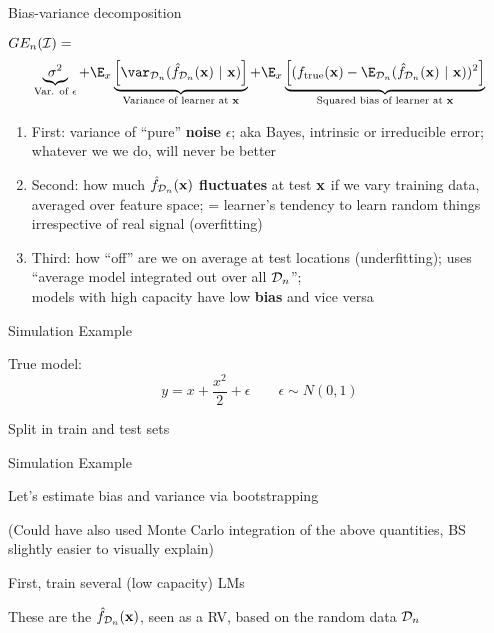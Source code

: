 \documentclass[11pt,compress,t,notes=noshow, xcolor=table]{beamer}
\begin{document}
\begin{frame}{Bias-variance decomposition}


$GE_n(\mathcal{I}) =$  
$$
 \underbrace{\sigma^2}_{\text{Var. of $\epsilon$}} + \E_{x}\underbrace{\left[\var_{\D_n}(\fh_{\D_n}(\xv) ~|~\xv)\right]}_{\text{Variance of learner at } \xv} + \E_{x}\underbrace{\left[(\ftrue(\xv)-\E_{\D_n}(\fh_{\D_n}(\xv)~|~\xv))^2\right]}_{\text{Squared bias of learner at } \xv}  
$$

\begin{enumerate}
  \item First: variance of ``pure''
     \textbf{noise} $\epsilon$; aka Bayes, intrinsic or irreducible error; 
    whatever we we do, will never be better
  \item Second: how much \textbf{$\hat{f}_{\mathcal{D}_n}(\mathbf{x})$ fluctuates} at test $\mathbf{x}$ if we vary training data, averaged over feature space; = learner's tendency to learn random things irrespective of real signal (overfitting)
  
  \item Third: how ``off'' are we on average at test locations (underfitting); uses ``average model integrated out over all $\mathcal{D}_n$''; \\
  models with high capacity have low \textbf{bias} and vice versa
\end{enumerate}


\end{frame} 

\begin{framei}[sep=L]{Simulation Example}

\item True model:
$$y = x + \frac{x^2}{2} + \epsilon  \qquad \epsilon \sim 
N (0, 1)$$
\item Split in train and test sets 


\end{framei} 


\begin{framei}[sep=M]{Simulation Example}

\item Let's estimate bias and variance via bootstrapping

\item (Could have also used Monte Carlo integration of the above quantities,
BS slightly easier to visually explain)

\item First, train several (low capacity) LMs
\item These are the $\hat{f}_{\mathcal{D}_n}(\mathbf{x})$, seen as a RV, based on the random
data $\mathcal{D}_n$

\splitVCC
  {}
  {}

\end{framei} 
\end{document}
